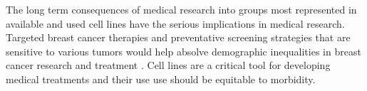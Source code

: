 \documentclass[11pt]{article}
\begin{document}



The long term consequences of medical research into groups most represented in available and used cell lines have the serious implications in medical research. Targeted breast cancer therapies and preventative screening strategies that are sensitive to various tumors would help absolve demographic inequalities in breast cancer research and treatment \cite{batina2013variation}. Cell lines are a critical tool for developing medical treatments and their use use should be equitable to morbidity.%
\end{document}
